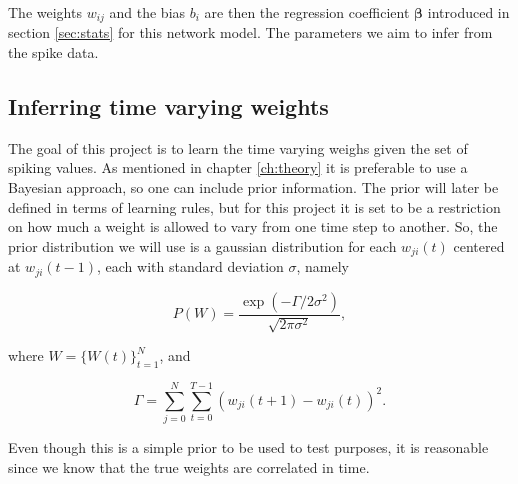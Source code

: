 The weights $w_{ij}$ and the bias $b_i$ are then the regression coefficient $\bm {\beta}$ introduced in section \ref{sec:stats} for this network model. The parameters we aim to infer from the spike data.







\subsection{Inferring time varying weights}
The goal of this project is to learn the time varying weighs given the set of spiking values. As mentioned in chapter \ref{ch:theory} it is preferable to use a Bayesian approach, so one can include prior information. The prior will later be defined in terms of learning rules, but for this project it is set to be a restriction on how much a weight is allowed to vary from one time step to another. So, the prior distribution we will use is a gaussian distribution for each $w_{ji}(t)$ centered at $w_{ji}(t-1)$, each with standard deviation $\sigma$, namely

\begin{equation}
    P(W) = \frac{\exp(-\Gamma /2\sigma^2)}{\sqrt{2\pi \sigma^2}},
\end{equation}

where $W=\{W(t)\}_{t=1}^N$, and

\begin{equation}
    \Gamma = \sum_{j=0}^{N} \sum_{t=0}^{T-1} (w_{ji}(t+1)-w_{ji}(t))^2.
\end{equation}

Even though this is a simple prior to be used to test purposes, it is reasonable since we know that the true weights are correlated in time. 

